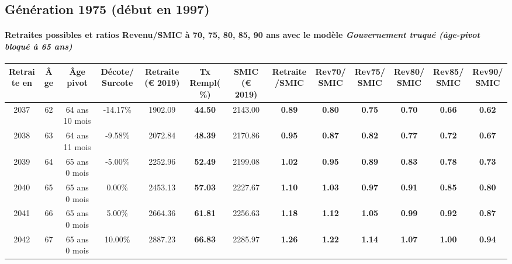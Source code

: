 \subsection{Génération 1975 (début en 1997)} 

\paragraph{Retraites possibles et ratios Revenu/SMIC à 70, 75, 80, 85, 90 ans avec le modèle \emph{Gouvernement truqué (âge-pivot bloqué à 65 ans)}}  
 
{ \scriptsize \begin{center} 
\begin{tabular}[htb]{|c|c||c|c||c|c||c||c|c|c|c|c|c|} 
\hline 
 Retraite en &  Âge &  Âge pivot &  Décote/Surcote &  Retraite (\euro{} 2019) &  Tx Rempl(\%) &  SMIC (\euro{} 2019) &  Retraite/SMIC &  Rev70/SMIC &  Rev75/SMIC &  Rev80/SMIC &  Rev85/SMIC &  Rev90/SMIC \\ 
\hline \hline 
 2037 &  62 &  64 ans 10 mois &  -14.17\% &  1902.09 &  {\bf 44.50} &  2143.00 &  {\bf {\color{red} 0.89}} &  {\bf {\color{red} 0.80}} &  {\bf {\color{red} 0.75}} &  {\bf {\color{red} 0.70}} &  {\bf {\color{red} 0.66}} &  {\bf {\color{red} 0.62}} \\ 
\hline 
 2038 &  63 &  64 ans 11 mois &  -9.58\% &  2072.84 &  {\bf 48.39} &  2170.86 &  {\bf {\color{red} 0.95}} &  {\bf {\color{red} 0.87}} &  {\bf {\color{red} 0.82}} &  {\bf {\color{red} 0.77}} &  {\bf {\color{red} 0.72}} &  {\bf {\color{red} 0.67}} \\ 
\hline 
 2039 &  64 &  65 ans 0 mois &  -5.00\% &  2252.96 &  {\bf 52.49} &  2199.08 &  {\bf 1.02} &  {\bf {\color{red} 0.95}} &  {\bf {\color{red} 0.89}} &  {\bf {\color{red} 0.83}} &  {\bf {\color{red} 0.78}} &  {\bf {\color{red} 0.73}} \\ 
\hline 
 2040 &  65 &  65 ans 0 mois &  0.00\% &  2453.13 &  {\bf 57.03} &  2227.67 &  {\bf 1.10} &  {\bf 1.03} &  {\bf {\color{red} 0.97}} &  {\bf {\color{red} 0.91}} &  {\bf {\color{red} 0.85}} &  {\bf {\color{red} 0.80}} \\ 
\hline 
 2041 &  66 &  65 ans 0 mois &  5.00\% &  2664.36 &  {\bf 61.81} &  2256.63 &  {\bf 1.18} &  {\bf 1.12} &  {\bf 1.05} &  {\bf {\color{red} 0.99}} &  {\bf {\color{red} 0.92}} &  {\bf {\color{red} 0.87}} \\ 
\hline 
 2042 &  67 &  65 ans 0 mois &  10.00\% &  2887.23 &  {\bf 66.83} &  2285.97 &  {\bf 1.26} &  {\bf 1.22} &  {\bf 1.14} &  {\bf 1.07} &  {\bf 1.00} &  {\bf {\color{red} 0.94}} \\ 
\hline 
\hline 
\end{tabular} 
\end{center} } 
